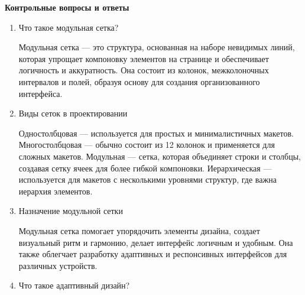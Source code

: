 \begin{itemize}
\noindent
\begin{minipage}{\linewidth}
\end{minipage}
\bigskip

\textbf{Контрольные вопросы и ответы}

\begin{enumerate}
    \item Что такое модульная сетка?

Модульная сетка — это структура, основанная на наборе невидимых линий, которая упрощает компоновку элементов на странице и обеспечивает логичность и аккуратность. Она состоит из колонок, межколоночных интервалов и полей, образуя основу для создания организованного интерфейса.

    \item Виды сеток в проектировании

    Одностолбцовая — используется для простых и минималистичных макетов.
    Многостолбцовая — обычно состоит из 12 колонок и применяется для сложных макетов.
    Модульная — сетка, которая объединяет строки и столбцы, создавая сетку ячеек для более гибкой компоновки.
    Иерархическая — используется для макетов с несколькими уровнями структур, где важна иерархия элементов.

    \item Назначение модульной сетки

Модульная сетка помогает упорядочить элементы дизайна, создает визуальный ритм и гармонию, делает интерфейс логичным и удобным. Она также облегчает разработку адаптивных и респонсивных интерфейсов для различных устройств.

    \item Что такое адаптивный дизайн?


\end{enumerate}
\end{itemize}
